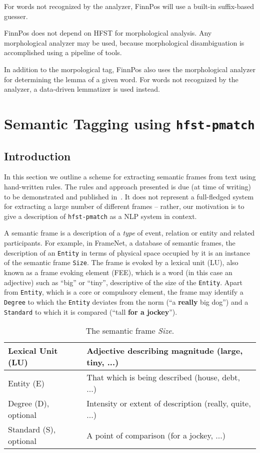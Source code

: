 \documentclass{llncs}
\begin{document}
For words not recognized by the analyzer, FinnPos will use a built-in
suffix-based guesser.

FinnPos does not depend on HFST for morphological analysis. Any
morphological analyzer may be used, because morphological
disambiguation is accomplished using a pipeline of tools.

In addition to the morpological tag, FinnPos also uses the
morphological analyzer for determining the lemma of a given word. For
words not recognized by the analyzer, a data-driven lemmatizer is used
instead.

\section{Semantic Tagging using {\tt hfst-pmatch}}\label{sec:sem-tagging}

\subsection{Introduction}

In this section we outline a scheme for extracting semantic frames from text
using hand-written rules. The rules and approach presented is due (at time of
writing) to be demonstrated and published in~\cite{hardwick/2015}. It does not
represent a full-fledged system for extracting a large number of different
frames -- rather, our motivation is to give a description of
\verb+hfst-pmatch+ as a NLP system in context.

A semantic frame \cite{semantic-frame} is a description of a \emph{type} of event, relation or entity
and related participants. For example, in FrameNet,
a database of semantic frames,
the description of an \verb+Entity+ in terms of physical space occupied by it is
an instance of the semantic frame \verb+Size+. The frame is evoked by
a lexical unit (LU), also known as a frame evoking element (FEE), which is a
word (in this case an adjective)
such as ``big'' or ``tiny'', descriptive of the size of the \verb+Entity+.
Apart from \verb+Entity+, which is a core or compulsory element, the
frame may identify a \verb+Degree+ to which the \verb+Entity+ deviates
from the norm (``a \textbf{really} big dog'') and a \verb+Standard+ to
which it is compared (``tall \textbf{for a jockey}'').

  \begin{center}
\begin{table}[h]
  \begin{tabular}{ | l | l |}
\hline
Lexical Unit (LU) & Adjective describing magnitude (large, tiny, ...) \\
\hline
Entity (E) & That which is being described (house, debt, ...) \\
\hline
Degree (D), optional & Intensity or extent of description
(really, quite, ...) \\
\hline
Standard (S), optional & A point of comparison (for a jockey, ...) \\
\hline
    \end{tabular}
    \caption{The semantic frame \emph{Size}.}
\end{table}
      \end{center}
\end{document}
